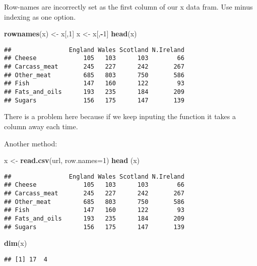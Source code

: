 \documentclass[]{article}
\newenvironment{Shaded}{\begin{snugshade}}{\end{snugshade}}
\newcommand{\DataTypeTok}[1]{\textcolor[rgb]{0.13,0.29,0.53}{#1}}
\newcommand{\DecValTok}[1]{\textcolor[rgb]{0.00,0.00,0.81}{#1}}
\newcommand{\KeywordTok}[1]{\textcolor[rgb]{0.13,0.29,0.53}{\textbf{#1}}}
\newcommand{\NormalTok}[1]{#1}
\newcommand{\OperatorTok}[1]{\textcolor[rgb]{0.81,0.36,0.00}{\textbf{#1}}}
\newcommand{\StringTok}[1]{\textcolor[rgb]{0.31,0.60,0.02}{#1}}
\begin{document}
Row-names are incorrectly set as the first column of our x data fram.
Use minus indexing as one option.

\begin{Shaded}
\begin{Highlighting}[]
\KeywordTok{rownames}\NormalTok{(x) <-}\StringTok{ }\NormalTok{x[,}\DecValTok{1}\NormalTok{]}
\NormalTok{x <-}\StringTok{ }\NormalTok{x[,}\OperatorTok{-}\DecValTok{1}\NormalTok{]}
\KeywordTok{head}\NormalTok{(x)}
\end{Highlighting}
\end{Shaded}

\begin{verbatim}
##                England Wales Scotland N.Ireland
## Cheese             105   103      103        66
## Carcass_meat       245   227      242       267
## Other_meat         685   803      750       586
## Fish               147   160      122        93
## Fats_and_oils      193   235      184       209
## Sugars             156   175      147       139
\end{verbatim}

There is a problem here because if we keep inputing the function it
takes a column away each time.

Another method:

\begin{Shaded}
\begin{Highlighting}[]
\NormalTok{x <-}\StringTok{ }\KeywordTok{read.csv}\NormalTok{(url, }\DataTypeTok{row.names=}\DecValTok{1}\NormalTok{)}
\KeywordTok{head}\NormalTok{ (x)}
\end{Highlighting}
\end{Shaded}

\begin{verbatim}
##                England Wales Scotland N.Ireland
## Cheese             105   103      103        66
## Carcass_meat       245   227      242       267
## Other_meat         685   803      750       586
## Fish               147   160      122        93
## Fats_and_oils      193   235      184       209
## Sugars             156   175      147       139
\end{verbatim}

\begin{Shaded}
\begin{Highlighting}[]
\KeywordTok{dim}\NormalTok{(x)}
\end{Highlighting}
\end{Shaded}

\begin{verbatim}
## [1] 17  4
\end{verbatim}
\end{document}
